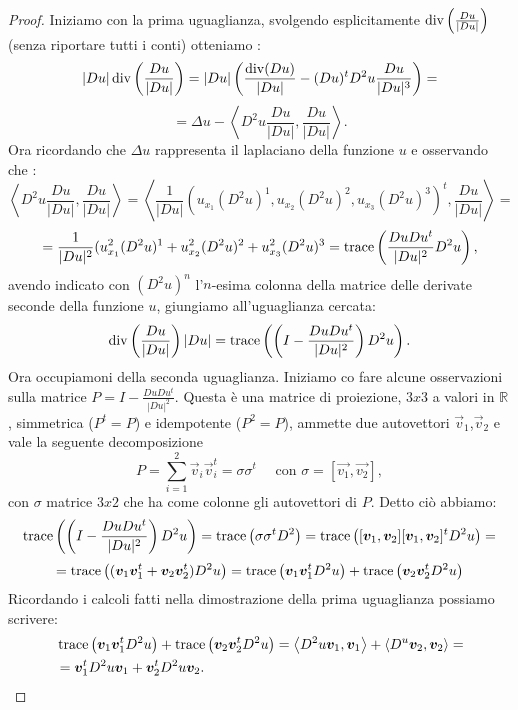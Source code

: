 \begin{proof}
Iniziamo con la prima uguaglianza, svolgendo esplicitamente $\operatorname{div}\left(\frac{Du}{|Du|}\right)$ (senza riportare tutti i conti) otteniamo :
\[
|Du|\operatorname{div}\left(\frac{Du}{|Du|}\right)=|Du|\left(\frac{\operatorname{div}(Du)}{|Du|} -(Du)^tD^2u\frac{Du}{|Du|^3}\right) =
\]
\[
= \Delta u - \left<D^2u\frac{Du}{|Du|},\frac{Du}{|Du|}\right> .
\]
Ora ricordando che $\Delta u$ rappresenta il laplaciano della funzione $u$ e osservando che :
\[
\left<D^2u\frac{Du}{|Du|},\frac{Du}{|Du|}\right> = \left<\frac{1}{|Du|}(u_{x_1}(D^2u)^1,u_{x_2}(D^2u)^2,u_{x_3}(D^2u)^3)^t,\frac{Du}{|Du|}\right> =
\]
\[
=\frac{1}{|Du|^2}(u_{x_1}^2(D^2u)^1+u_{x_2}^2(D^2u)^2+u_{x_3}^2(D^2u)^3 = \operatorname{trace}\left(\frac{DuDu^t}{|Du|^2}D^2u\right),
\]
avendo indicato con $(D^2u)^n$ l'$n$-esima colonna della matrice delle derivate seconde della funzione $u$, giungiamo all'uguaglianza cercata:
\[
\operatorname{div}\left(\frac{Du}{|Du|}\right)|Du| = \operatorname{trace}\left(\left(I-{\frac{DuDu^t}{|Du|^2}}\right)D^2u\right).
\] 
Ora occupiamoni della seconda uguaglianza. Iniziamo co fare alcune osservazioni sulla matrice $P=I-\frac{DuDu^t}{|Du|^2}$. Questa è una matrice di proiezione, $3x3$ a valori in $\mathbb{R}$, simmetrica ($P^t=P$) e idempotente ($P^2=P$), ammette due autovettori $\vec{v}_1$,$\vec{v}_2$ e vale la seguente decomposizione
\[
P=\sum_{i=1}^2\vec{v}_i\vec{v}_i^t=\sigma\sigma^t\quad\text{ con } \sigma=[\vec{v_1},\vec{v_2}],
\]
con $\sigma$ matrice $3x2$ che ha come colonne gli autovettori di $P$. Detto ciò abbiamo: 
\[
\operatorname{trace}\left(\left(I-{\frac{DuDu^t}{|Du|^2}}\right)D^2u\right)=\operatorname{trace}\left(\sigma\sigma^tD^2\right)=\operatorname{trace}\left([\bm{v}_1,\bm{v}_2][\bm{v}_1,\bm{v}_2]^tD^2u\right)=
\]
\[
=\operatorname{trace}\left((\bm{v}_1\bm{v}_1^t+\bm{v}_2\bm{v}_2^t)D^2u\right)=\operatorname{trace}\left(\bm{v}_1\bm{v}_1^tD^2u\right)+\operatorname{trace}\left(\bm{v}_2\bm{v}_2^tD^2u\right)
\]
Ricordando i calcoli fatti nella dimostrazione della prima uguaglianza possiamo scrivere:
\[
\begin{split}
&\operatorname{trace}\left(\bm{v}_1\bm{v}_1^tD^2u\right)+\operatorname{trace}\left(\bm{v}_2\bm{v}_2^tD^2u\right)=\left<D^2u\bm{v}_1,\bm{v}_1\right>+\left<D^u\bm{v}_2,\bm{v}_2\right>=\\
& =\bm{v}_1^tD^2u\bm{v}_1+\bm{v}_2^tD^2u\bm{v}_2.
\end{split}
\]
\end{proof}

